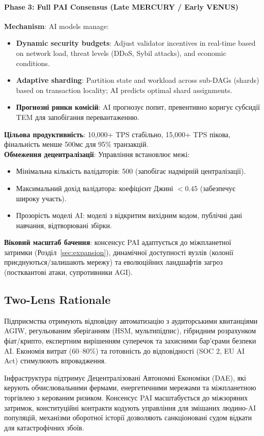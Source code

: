 \documentclass[11pt]{article}
\begin{document}
\paragraph{Phase 3: Full PAI Consensus (Late MERCURY / Early VENUS)}
\textbf{Mechanism}: AI models manage:
\begin{itemize}[noitemsep]
  \item \textbf{Dynamic security budgets}: Adjust validator incentives in real-time based on network load, threat levels (DDoS, Sybil attacks), and economic conditions.
  \item \textbf{Adaptive sharding}: Partition state and workload across sub-DAGs (shards) based on transaction locality; AI predicts optimal shard assignments.
  \item \textbf{Прогнозні ринки комісій}: AI прогнозує попит, превентивно коригує субсидії TEM для запобігання перевантаженню.
\end{itemize}
\textbf{Цільова продуктивність}: 10,000+ TPS стабільно, 15,000+ TPS пікова, фінальність менше 500мс для 95\% транзакцій.\\
\textbf{Обмеження децентралізації}: Управління встановлює межі:
\begin{itemize}[noitemsep]
  \item Мінімальна кількість валідаторів: 500 (запобігає надмірній централізації).
  \item Максимальний дохід валідатора: коефіцієнт Джині $<0.45$ (забезпечує широку участь).
  \item Прозорість моделі AI: моделі з відкритим вихідним кодом, публічні дані навчання, відтворювані збірки.
\end{itemize}
\textbf{Віковий масштаб бачення}: консенсус PAI адаптується до міжпланетної затримки (Розділ~\ref{sec:expansion}), динамічної доступності вузлів (колонії приєднуються/залишають мережу) та еволюційних ландшафтів загроз (постквантові атаки, супротивники AGI).

\subsection{Two-Lens Rationale}
\begin{description}[style=nextline]
  \item[Близький термін (Ера MERCURY)] Підприємства отримують відповідну автоматизацію з аудиторськими квитанціями AGIW, регульованим зберіганням (HSM, мультипідпис), гібридним розрахунком фіат/крипто, експертним вирішенням суперечок та захисними бар'єрами безпеки AI. Економія витрат (60--80\%) та готовність до відповідності (SOC 2, EU AI Act) стимулюють впровадження.
  \item[Віковий масштаб (VENUS через ANDROMEDA)] Інфраструктура підтримує Децентралізовані Автономні Економіки (DAE), які керують обчислювальними фермами, енергетичними мережами та міжпланетною торгівлею з керованим ризиком. Консенсус PAI масштабується до міжзоряних затримок, конституційні контракти кодують управління для змішаних людино-AI популяцій, механізми оборотної історії дозволяють санкціоновані судом відкати для катастрофічних збоїв.
\end{description}
\end{document}
